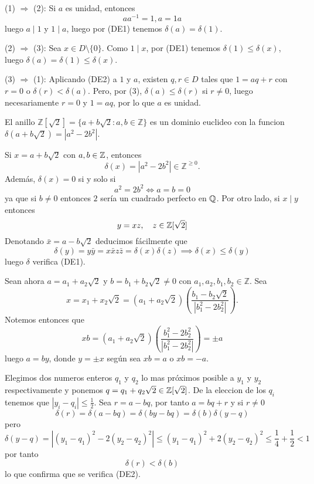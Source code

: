 \begin{proofbox}
(1) \(\Rightarrow\) (2): Si \(a\) es unidad, entonces
\[
a a^{-1} = 1, a = 1a
\]
luego \(a \mid 1\) y \(1 \mid a\), luego por (DE1) tenemos \(\delta(a) = \delta(1)\).

(2) \(\Rightarrow\) (3): Sea \(x \in D \setminus \{0\}\). Como \(1 \mid x\), por (DE1) tenemos \(\delta(1) \leq \delta(x)\), luego \(\delta(a) = \delta(1) \leq \delta(x)\).

(3) \(\Rightarrow\) (1): Aplicando (DE2) a \(1\) y \(a\), existen \(q, r \in D\) tales que \(1 = aq + r\) con \(r = 0\) o \(\delta(r) < \delta(a)\). Pero, por (3), \(\delta(a) \leq \delta(r)\) si \(r \neq 0\), luego necesariamente \(r = 0\) y \(1 = aq\), por lo que \(a\) es unidad.
\end{proofbox}

\begin{example}{}{}
El anillo \(\mathbb{Z}[\sqrt{2}] = \{a + b\sqrt{2} : a, b \in \mathbb{Z}\}\) es un dominio euclideo con la funcion \(\delta(a + b\sqrt{2}) = |a^2 - 2b^2|\).
\end{example}

\begin{proofbox}
Si \(x = a + b \sqrt{2}\) con \(a,b \in \mathbb{Z}\), entonces
\[
\delta(x) = |a^2 - 2b^2| \in \mathbb{Z}^{\geq 0}.
\]
Además, \(\delta(x) = 0\) si y solo si
\[
a^2 = 2b^2 \iff a = b = 0
\]
ya que si $b \neq 0$ entonces $2$ sería un cuadrado perfecto en $\mathbb{Q}$. Por otro lado, si $x \mid y$ entonces
\[
y = xz,\quad z \in \mathbb{Z}[\sqrt{2}]
\]
Denotando $\bar{x} = a - b\sqrt{2}$ deducimos fácilmente que
\[
\delta(y) = y\bar{y} = x\bar{x}z\bar{z} = \delta(x)\delta(z) \implies \delta(x) \leq \delta(y)
\]
luego \(\delta\) verifica (DE1).

Sean ahora \(a = a_1 + a_2\sqrt{2}\) y \(b = b_1 + b_2\sqrt{2} \neq 0\) con \(a_1, a_2, b_1, b_2 \in \mathbb{Z}\). Sea
\[
x = x_1 + x_2\sqrt{2} = (a_1 + a_2\sqrt{2})\left(\frac{b_1 - b_2\sqrt{2}}{|b_1^2 - 2b_2 ^2|}\right).
\]
Notemos entonces que
\[
xb = (a_1 + a_2\sqrt{2})\left(\frac{b_1^2 - 2b_2^2}{|b_1^2 - 2b_2 ^2|}\right) = \pm a
\]
luego $a = by$, donde $y = \pm x$ según sea $xb = a$ o $xb = -a$.

Elegimos dos numeros enteros \(q_1\) y \(q_2\) lo mas próximos posible a \(y_1\) y \(y_2\) respectivamente y ponemos \(q = q_1 + q_2\sqrt{2} \in \mathbb{Z}[\sqrt{2}]\). De la eleccion de los \(q_i\) tenemos que \(|y_i - q_i| \leq \frac{1}{2}\). Sea \(r = a - bq\), por tanto \(a = bq + r\) y si $r \neq 0$
\[
\delta(r) = \delta(a - bq) = \delta(by - bq) = \delta(b)\delta(y - q)
\]
pero
\[
\delta(y - q) = |(y_1 - q_1)^2 - 2(y_2 - q_2)^2| \leq (y_1 - q_1)^2 + 2(y_2 - q_2)^2 \leq \frac{1}{4} + \frac{1}{2} < 1
\]
por tanto
\[
\delta(r) < \delta(b)
\]
lo que confirma que se verifica (DE2).
\end{proofbox}

